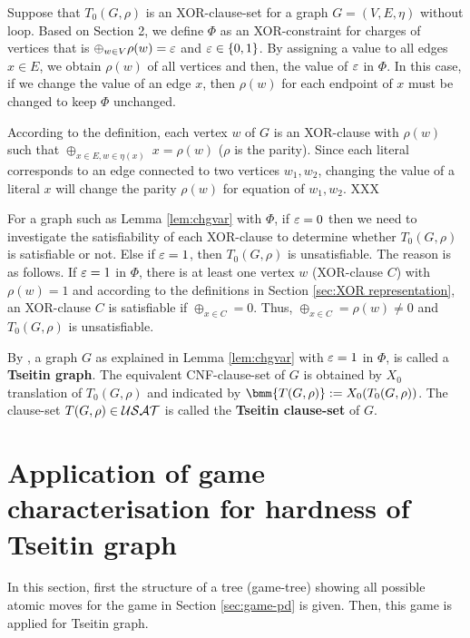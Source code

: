 \documentclass{report}
\begin{document}
\begin{lem}\label{lem:chgvar}
Suppose that $T_0(G,\rho)$ is an XOR-clause-set for a graph $G=(V,E,\eta)$ without loop. Based on \cite{Ts68} Section 2, we define $\Phi$ as an XOR-constraint for charges of vertices that is $\oplus_{w \in V} \rho(w) = \varepsilon$ and $\varepsilon \in \{ 0,1 \}$. By assigning a value to all edges $x \in E$, we obtain $\rho(w)$ of all vertices and then, the value of $\varepsilon$ in $\Phi$. In this case, if we change the value of an edge $x$, then $\rho(w)$ for each endpoint of $x$ must be changed to keep $\Phi$ unchanged.
\end{lem}
\begin{prf}
According to the definition, each vertex $w$ of $G$ is an XOR-clause with $\rho(w)$ such that  $\oplus_{x \in E, w \in \eta(x)} \; x = \rho(w)$ ($\rho$ is the parity). Since each literal corresponds to an edge connected to two vertices $w_1, w_2$, changing the value of a literal $x$ will change the parity $\rho(w)$ for equation of $w_1, w_2$. XXX
\end{prf}

For a graph such as Lemma \ref{lem:chgvar} with $\Phi$, if $\varepsilon=0$ then we need to investigate the satisfiability of each XOR-clause to determine whether $T_0(G,\rho)$ is satisfiable or not. Else if $\varepsilon=1$, then $T_0(G,\rho)$ is unsatisfiable. The reason is as follows. If $\varepsilon=1$ in $\Phi$, there is at least one vertex $w$ (XOR-clause $C$) with $ \rho(w) =1$ and according to the definitions in Section \ref{sec:XOR representation}, an XOR-clause $C$ is satisfiable if $\oplus_{x \in C} = 0$. Thus, $\oplus_{x \in C} = \rho(w) \not =0$ and $T_0(G,\rho)$ is unsatisfiable.

\begin{defi}\label{def:tseitindef}
By \cite{GwynneKullmann2013GoodRepresentationsIIex}, a graph $G$ as explained in Lemma \ref{lem:chgvar} with $\varepsilon=1$ in $\Phi$, is called a \textbf{Tseitin graph}. The equivalent CNF-clause-set of $G$ is obtained by $X_0$ translation of $T_0(G,\rho)$ and indicated by $\bmm{T(G,\rho)} := X_0(T_0(G,\rho))$. The clause-set $T(G,\rho) \in \mathcal{USAT}$ is called the \textbf{Tseitin clause-set} of $G$.
\end{defi}
\section{Application of game characterisation for hardness of Tseitin graph}
\label{sec:appgame}

In this section, first the structure of a tree (game-tree) showing all possible atomic moves for the game in Section \ref{sec:game-pd} is given. Then, this game is applied for Tseitin graph.
\end{document}

